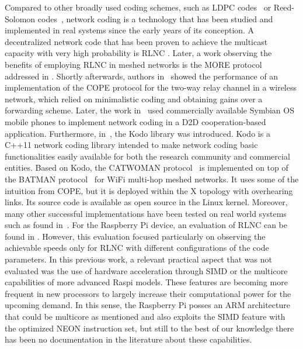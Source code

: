 Compared to other broadly used coding schemes, such as \ac{LDPC}
codes~\cite{gallager1962low} or Reed-Solomon
codes~\cite{reed1960polynomial}, network coding is a technology that
has been studied and implemented in real systems since the early years of
its conception. A decentralized network code that has been proven
to achieve the multicast capacity with very high probability is
\ac{RLNC} \cite{ho2006random}. Later, a work observing the
benefits of employing \ac{RLNC} in meshed networks is the MORE protocol
addressed in \cite{chachulski2007more}. Shortly afterwards, authors
in~\cite{katti2008xors} showed the performance of an implementation
of the COPE protocol for the two-way relay channel
in a wireless network, which relied on minimalistic coding and obtaining
gains over a forwarding scheme. Later, the work
in~\cite{pedersen2008implementation} used commercially available
Symbian OS mobile phones to implement network coding in a
\ac{D2D} cooperation-based application. Furthermore,
in~\cite{kodo2011pedersen}, the Kodo library was introduced. Kodo is
a C++11 network coding library intended to make network coding
basic functionalities easily available for both the research community
and commercial entities. Based on Kodo, the CATWOMAN
protocol~\cite{hundeboll2012catwoman} is implemented on top of the
BATMAN protocol~\cite{johnson2008simple} for WiFi multi-hop meshed
networks. It uses some of the intuition from COPE, but it is deployed
within the X topology with overhearing links. Its source code is available
as open source in the Linux kernel. Moreover, many other successful
implementations have been tested on real world systems such as
found in~\cite{pahlevani2013playncool,krigslund2013core,
paramanathan2013leanandmean,seferoglu2011i2nc}. For the Raspberry Pi device, an
evaluation of \ac{RLNC} can be found in \cite{paramanathan2014sharing}.
However, this evaluation focused particularly on observing the achievable
speeds only for \ac{RLNC} with different configurations of
the code parameters. In this previous work, a relevant practical aspect that
was not evaluated was the use of hardware acceleration through \ac{SIMD} or
the multicore capabilities of more advanced \ac{Raspi} models. These features are
becoming more frequent in new processors to largely increase their computational
power for the upcoming demand. In this sense, the Raspberry Pi posses an \ac{ARM}
architecture that could be multicore as mentioned and also exploits the \ac{SIMD}
feature with the optimized NEON instruction set, but still to the best of our knowledge
there has been no documentation in the literature about these capabilities.

